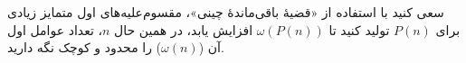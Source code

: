 سعی کنید با استفاده از «قضیهٔ باقی‌ماندهٔ چینی»، مقسوم‌علیه‌های اول متمایز زیادی برای $P(n)$ تولید کنید تا $\omega(P(n))$ افزایش یابد، در همین حال  $n$، تعداد عوامل اول آن ($\omega(n)$) را محدود و کوچک نگه دارید.
